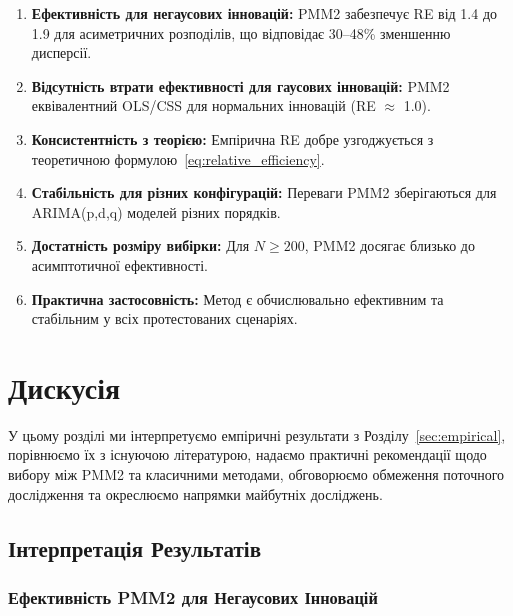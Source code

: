 \documentclass[12pt,a4paper]{article}
\begin{document}
	\begin{enumerate}
		\item \textbf{Ефективність для негаусових інновацій:} PMM2 забезпечує RE від 1.4 до 1.9 для асиметричних розподілів, що відповідає 30--48\% зменшенню дисперсії.
		
		\item \textbf{Відсутність втрати ефективності для гаусових інновацій:} PMM2 еквівалентний OLS/CSS для нормальних інновацій (RE $\approx$ 1.0).
		
		\item \textbf{Консистентність з теорією:} Емпірична RE добре узгоджується з теоретичною формулою~\eqref{eq:relative_efficiency}.
		
		\item \textbf{Стабільність для різних конфігурацій:} Переваги PMM2 зберігаються для ARIMA(p,d,q) моделей різних порядків.
		
		\item \textbf{Достатність розміру вибірки:} Для $N \geq 200$, PMM2 досягає близько до асимптотичної ефективності.
		
		\item \textbf{Практична застосовність:} Метод є обчислювально ефективним та стабільним у всіх протестованих сценаріях.
	\end{enumerate}
	
	
	\section{Дискусія}
	\label{sec:discussion}
	
	У цьому розділі ми інтерпретуємо емпіричні результати з Розділу~\ref{sec:empirical}, порівнюємо їх з існуючою літературою, надаємо практичні рекомендації щодо вибору між PMM2 та класичними методами, обговорюємо обмеження поточного дослідження та окреслюємо напрямки майбутніх досліджень.
	
	\subsection{Інтерпретація Результатів}
	\label{subsec:interpretation}
	
	\subsubsection{Ефективність PMM2 для Негаусових Інновацій}
	
\end{document}
